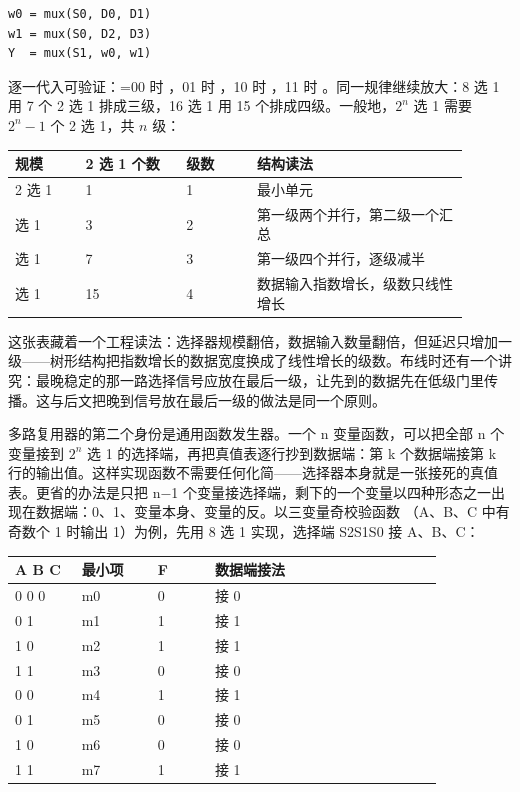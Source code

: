 \begin{lstlisting}
w0 = mux(S0, D0, D1)
w1 = mux(S0, D2, D3)
Y  = mux(S1, w0, w1)
\end{lstlisting}

逐一代入可验证：=00 时 ，01 时 ，10 时 ，11 时 。同一规律继续放大：8 选 1 用 7 个 2 选 1 排成三级，16 选 1 用 15 个排成四级。一般地，$2^n$ 选 1 需要 $2^n - 1$ 个 2 选 1，共 $n$ 级：

\begin{longtable}{L{0.14\linewidth}L{0.2\linewidth}L{0.14\linewidth}L{0.42\linewidth}}
\toprule
规模 & 2 选 1 个数 & 级数 & 结构读法 \\
 选 1 & 1 & 1 & 最小单元 \\ 选 1 & 3 & 2 & 第一级两个并行，第二级一个汇总 \\ 选 1 & 7 & 3 & 第一级四个并行，逐级减半 \\ 选 1 & 15 & 4 & 数据输入指数增长，级数只线性增长 \\
\bottomrule
\end{longtable}

这张表藏着一个工程读法：选择器规模翻倍，数据输入数量翻倍，但延迟只增加一级——树形结构把指数增长的数据宽度换成了线性增长的级数。布线时还有一个讲究：最晚稳定的那一路选择信号应放在最后一级，让先到的数据先在低级门里传播。这与后文把晚到信号放在最后一级的做法是同一个原则。

多路复用器的第二个身份是通用函数发生器。一个 n 变量函数，可以把全部 n 个变量接到 $2^n$ 选 1 的选择端，再把真值表逐行抄到数据端：第 k 个数据端接第 k 行的输出值。这样实现函数不需要任何化简——选择器本身就是一张接死的真值表。更省的办法是只把 n$-$1 个变量接选择端，剩下的一个变量以四种形态之一出现在数据端：0、1、变量本身、变量的反。以三变量奇校验函数 （A、B、C 中有奇数个 1 时输出 1）为例，先用 8 选 1 实现，选择端 S2S1S0 接 A、B、C：

\begin{longtable}{L{0.14\linewidth}L{0.16\linewidth}L{0.12\linewidth}L{0.48\linewidth}}
\toprule
A B C & 最小项 & F & 数据端接法 \\
 0 0 & m0 & 0 &  接 0 \\ 0 1 & m1 & 1 &  接 1 \\ 1 0 & m2 & 1 &  接 1 \\ 1 1 & m3 & 0 &  接 0 \\ 0 0 & m4 & 1 &  接 1 \\ 0 1 & m5 & 0 &  接 0 \\ 1 0 & m6 & 0 &  接 0 \\ 1 1 & m7 & 1 &  接 1 \\
\bottomrule
\end{longtable}

